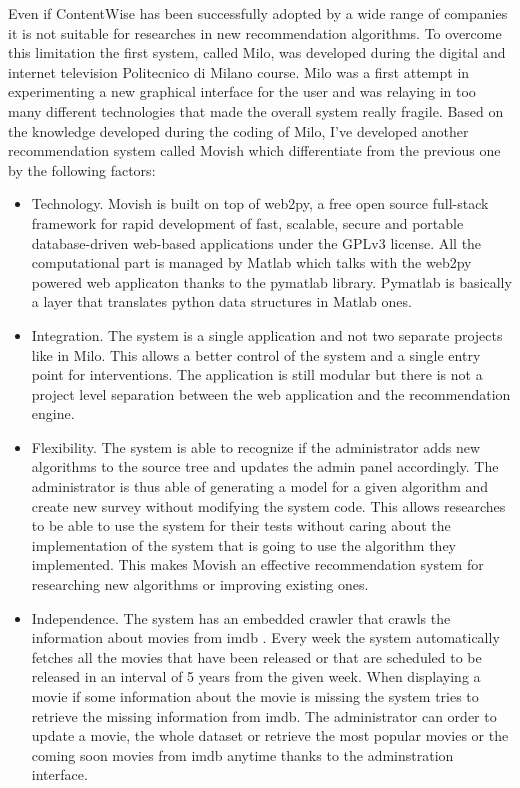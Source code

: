 Even if ContentWise has been successfully adopted by a wide range of companies it is not suitable for researches in new recommendation algorithms. To overcome this limitation the first system, called Milo, was developed during the digital and internet television Politecnico di Milano course. Milo was a first attempt in experimenting a new graphical interface for the user and was relaying in too many different technologies that made the overall system really fragile.
Based on the knowledge developed during the coding of Milo, I've developed another recommendation system called Movish which differentiate from the previous one by the following factors:
\begin{itemize}
\item Technology. Movish is built on top of web2py\cite{web2py}, a free open source full-stack framework for rapid development of fast, scalable, secure and portable database-driven web-based applications under the GPLv3\cite{gplv3} license. All the computational part is managed by Matlab which talks with the web2py powered web applicaton thanks to the pymatlab\cite{pymatlab} library. Pymatlab is basically a layer that translates python data structures in Matlab ones. 
\item Integration. The system is a single application and not two separate projects like in Milo. This allows a better control of the system and a single entry point for interventions. The application is still modular but there is not a project level separation between the web application and the recommendation engine.
\item Flexibility. The system is able to recognize if the administrator adds new algorithms to the source tree and updates the admin panel accordingly. The administrator is thus able of generating a model for a given algorithm and create new survey without modifying the system code. This allows researches to be able to use the system for their tests without caring about the implementation of the system that is going to use the algorithm they implemented. This makes Movish an effective recommendation system for researching new algorithms or improving existing ones. 
\item Independence. The system has an embedded crawler that crawls the information about movies from imdb \cite{imdb}. Every week the system automatically fetches all the movies that have been released or that are scheduled to be released in an interval of 5 years from the given week. When displaying a movie if some information about the movie is missing the system tries to retrieve the missing information from imdb. The administrator can order to update a movie, the whole dataset or retrieve the most popular movies or the coming soon movies from imdb anytime thanks to the adminstration interface.

\end{itemize}
